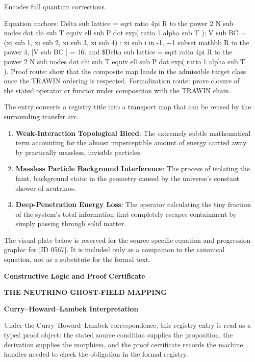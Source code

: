 Encodes full quantum corrections.

Equation anchors: Delta sub lattice = sqrt ratio 4pi R to the power 2 N sub nodes dot chi sub T equiv ell sub P dot exp( ratio 1 alpha sub T ); V sub BC = (xi sub 1, xi sub 2, xi sub 3, xi sub 4) : xi sub i in -1, +1 subset mathbb R to the power 4, |V sub BC | = 16; and \$Delta sub lattice = sqrt ratio 4pi R to the power 2 N sub nodes dot chi sub T equiv ell sub P dot exp( ratio 1 alpha sub T ). Proof route: show that the composite map lands in the admissible target class once the TRAWIN ordering is respected. Formalization route: prove closure of the stated operator or functor under composition with the TRAWIN chain.

The entry converts a registry title into a transport map that can be reused by the surrounding transfer arc.
\endgroup

\begin{enumerate}[leftmargin=1.6em,itemsep=6pt,topsep=4pt]
\item \textbf{Weak-Interaction Topological Bleed}: The extremely subtle mathematical term accounting for the almost imperceptible amount of energy carried away by practically massless, invisible particles.
\item \textbf{Massless Particle Background Interference}: The process of isolating the faint, background static in the geometry caused by the universe's constant shower of neutrinos.
\item \textbf{Deep-Penetration Energy Loss}: The operator calculating the tiny fraction of the system's total information that completely escapes containment by simply passing through solid matter.
\end{enumerate}

\begingroup\footnotesize\sloppy
The visual plate below is reserved for the source-specific equation and progression graphic for [ID 0567]. It is included only as a companion to the canonical equation, not as a substitute for the formal text.
\par\endgroup
\ifTZPDarkEdition
{}
\fi

\clearpage
\begingroup\tzpsupportsetup
\noindent\textbf{\fontsize{10.8pt}{12.8pt}\selectfont [ID 0567] Constructive Logic and Proof Certificate}\par
\noindent\textbf{\fontsize{10pt}{12pt}\selectfont THE NEUTRINO GHOST-FIELD MAPPING}\par
\vspace{0.45em}
\begingroup
\footnotesize
\setlength{\parskip}{0.22em}
\setlength{\parindent}{0pt}
\noindent\textbf{Curry--Howard--Lambek Interpretation}\par
Under the Curry--Howard--Lambek correspondence, this registry entry is read as a typed proof
object: the stated source condition supplies the proposition, the derivation supplies the
morphism, and the proof certificate records the machine handles needed to check the obligation
in the formal registry.

